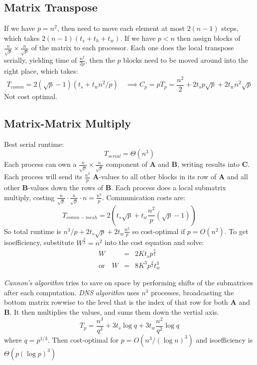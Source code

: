 \documentclass[a4paper,10pt]{article}
\begin{document}
\subsection{Matrix Transpose}
If we have $p = n^2$, then need to move each element at most $2(n-1)$ steps, which takes $2(n-1)(t_s + t_h + t_w)$. If we have $p<n$ then assign blocks of $\frac{n}{\sqrt{p}}\times\frac{n}{\sqrt{p}}$ of the matrix to each processor.  Each one does the local transpose serially, yielding time of $\frac{n^2}{2p}$, then the $p$ blocks need to be moved around into the right place, which takes:
\[T_{comm} = 2(\sqrt{p}-1)(t_s + t_w n^2/p) \quad\implies C_p = pT_p = \frac{n^2}{2} + 2t_s p\sqrt{p} + 2t_wn^2 \sqrt{p} \]
Not cost optimal.

\subsection{Matrix-Matrix Multiply}
Best serial runtime:
\[ T_{serial} = \Theta(n^3)\]
Each process can own a $\frac{n}{\sqrt{p}}\times\frac{n}{\sqrt{p}}$ component of $\mathbf{A}$ and $\mathbf{B}$, writing results into $\mathbf{C}$.  Each process will send its $\frac{n^2}{p}$ $\mathbf{A}$-values to all other blocks in its row of $\mathbf{A}$ and all other $\mathbf{B}$-values down the rows of $\mathbf{B}$.  Each process does a local submatrix multiply, costing $\frac{n}{\sqrt{p}}\cdot\frac{n}{\sqrt{p}}\cdot n = \frac{n^3}{p}$.  Communication costs are:
\[T_{comm-mesh} = 2\left(t_s \sqrt{p} + t_w \frac{n^2}{p}(\sqrt{p}-1)\right)\]
So total runtime is $n^3/p + 2t_s\sqrt{p} + 2t_w\frac{n^2}{p}$ so cost-optimal if $p = O(n^2)$.  To get isoefficiency, substitute $W^{\frac{2}{3}} = n^2$ into the cost equation and solve:
\begin{eqnarray}
W & = & 2Kt_s p^{\frac{3}{2}} \\
\text{or}\quad W &=& 8K^3p^{\frac{3}{2}}t_w^3
\end{eqnarray}

\emph{Cannon's algorithm} tries to save on space by performing shifts of the submatrices after each computation.  \emph{DNS algorithm} uses $n^3$ processes, broadcasting the bottom matrix rowwise to the level that is the index of that row for both $\mathbf{A}$ and $\mathbf{B}$.  It then multiplies the values, and sums them down the vertial axis.
\[T_p = \frac{n^3}{q^3} + 3t_s\log{q} + 3t_w\frac{n^2}{q^2}\log{q}\]
where $q = p^{1/3}$.  Then cost-optimal for $p=O(n^3/(\log{n})^3)$ and isoefficiency is $\Theta(p(\log{p})^3)$
\end{document}
